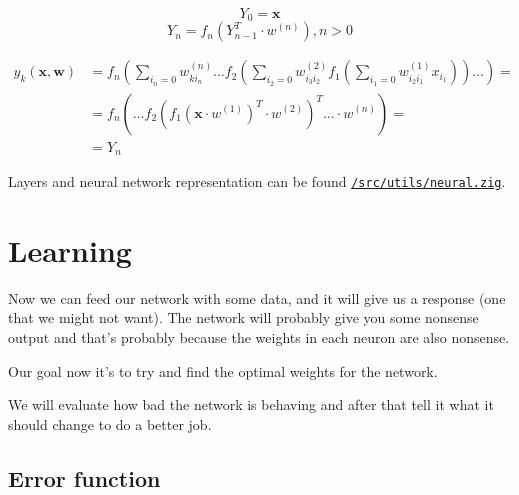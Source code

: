 \documentclass[a4paper,12pt]{article}
\theoremstyle{mytheoremstyle}
\theoremstyle{mytheoremstyle}
\theoremstyle{myproblemstyle}
\begin{document}
    \begin{equation}
        Y_{0} = \textbf{x}
    \end{equation}
    \begin{equation}
        Y_{n} = f_{n} \left( Y_{n - 1}^{T} \cdot w^{(n)} \right), n > 0
    \end{equation}

    \begin{equation}
        \begin{split}
            y_{k}(\mathbf{x}, \mathbf{w}) & = f_{n} \left( \displaystyle\sum_{i_{n}=0} w_{k i_{n}}^{(n)} \hdots f_{2} \left( \displaystyle\sum_{i_{2}=0} w_{i_{3}i_{2}}^{(2)} f_{1} \left( \displaystyle\sum_{i_{1}=0} w_{i_{2}i_{1}}^{(1)}x_{i_{1}} \right) \right) \hdots \right) = \\
            & = f_{n} \left( \hdots f_{2} \left( f_{1} \left( \mathbf{x} \cdot w^{(1)} \right)^{T} \cdot w^{(2)} \right)^{T} \hdots \cdot w^{(n)} \right) = \\
            & = Y_{n}
        \end{split}
        \label{eq:neural_network}
    \end{equation}



    Layers and neural network representation can be found
    \href{run:../src/utils/neural.zig}{\texttt{/src/utils/neural.zig}}.


    \section{Learning}

    Now we can feed our network with some data, and it will give us a response
    (one that we might not want). The network will probably give you some
    nonsense output and that's probably because the weights in each neuron are
    also nonsense.

    Our goal now it's to try and find the optimal weights for the network.

    We will evaluate how bad the network is behaving and after that tell it
    what it should change to do a better job.

    \subsection{Error function}
\end{document}

